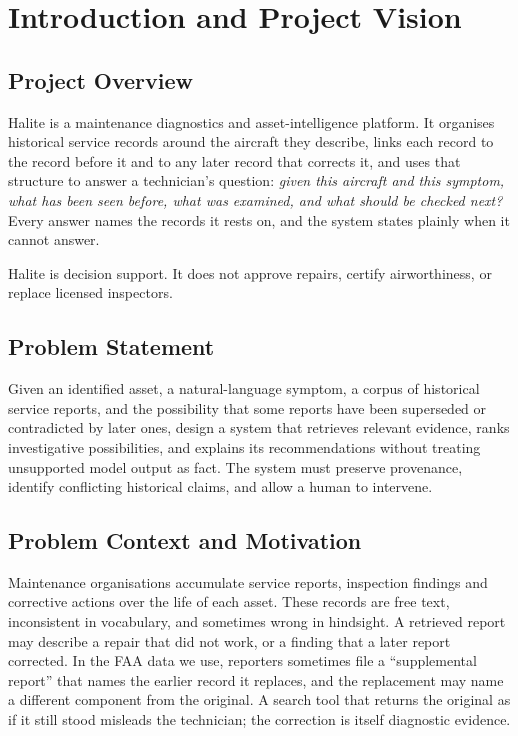 \chapter{Introduction and Project Vision}\label{ch:intro}

\section{Project Overview}
Halite is a maintenance diagnostics and asset-intelligence platform. It organises historical service records around the aircraft they describe, links each record to the record before it and to any later record that corrects it, and uses that structure to answer a technician's question: \emph{given this aircraft and this symptom, what has been seen before, what was examined, and what should be checked next?} Every answer names the records it rests on, and the system states plainly when it cannot answer.

Halite is decision support. It does not approve repairs, certify airworthiness, or replace licensed inspectors.

\section{Problem Statement}
Given an identified asset, a natural-language symptom, a corpus of historical service reports, and the possibility that some reports have been superseded or contradicted by later ones, design a system that retrieves relevant evidence, ranks investigative possibilities, and explains its recommendations without treating unsupported model output as fact. The system must preserve provenance, identify conflicting historical claims, and allow a human to intervene.

\section{Problem Context and Motivation}
Maintenance organisations accumulate service reports, inspection findings and corrective actions over the life of each asset. These records are free text, inconsistent in vocabulary, and sometimes wrong in hindsight. A retrieved report may describe a repair that did not work, or a finding that a later report corrected. In the FAA data we use, reporters sometimes file a ``supplemental report'' that names the earlier record it replaces, and the replacement may name a different component from the original. A search tool that returns the original as if it still stood misleads the technician; the correction is itself diagnostic evidence.

